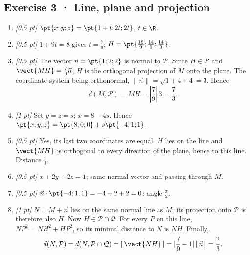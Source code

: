 \subsection*{Exercise 3 · Line, plane and projection}\begin{enumerate}

\item \textit{[0.5 pt]} $\pt{x;y;z}=\pt{1+t;2t;2t}$, $t\in\R$.

\item \textit{[0.5 pt]} $1+9t=8$ gives $t=\frac{7}{9}$; $H=\pt{\frac{16}{9};\frac{14}{9};\frac{14}{9}}$.

\item \textit{[0.5 pt]} The vector $\vec n=\pt{1;2;2}$ is normal to $\mathcal P$. Since $H\in\mathcal P$ and $\vect{MH}=\frac{7}{9}\vec n$, $H$ is the orthogonal projection of $M$ onto the plane. The coordinate system being orthonormal, $\|\vec n\|=\sqrt{1+4+4}=3$. Hence
\[d(M,\mathcal P)=MH=|\frac{7}{9}|\,3=\frac{7}{3}.\]

\item \textit{[1 pt]} Set $y=z=s$; $x=8-4s$. Hence $\pt{x;y;z}=\pt{8;0;0}+s\pt{-4;1;1}$.

\item \textit{[0.5 pt]} Yes, its last two coordinates are equal. $H$ lies on the line and $\vect{MH}$ is orthogonal to every direction of the plane, hence to this line. Distance $\frac{7}{3}$.

\item \textit{[0.5 pt]} $x+2y+2z=1$; same normal vector and passing through $M$.

\item \textit{[0.5 pt]} $\vec n\cdot\pt{-4;1;1}=-4+2+2=0$: angle $\frac{\pi}{2}$.

\item \textit{[1 pt]} $N=M+\vec n$ lies on the same normal line as $M$; its projection onto $\mathcal P$ is therefore also $H$. Now $H\in\mathcal P\cap\mathcal Q$. For every $P$ on this line, $NP^2=NH^2+HP^2$, so its minimal distance to $N$ is $NH$. Finally,
\[d(N,\mathcal P)=d(N,\mathcal P\cap\mathcal Q)=\|\vect{NH}\|=|\frac{7}{9}-1|\,\|\vec n\|=\frac{2}{3}.\]

\end{enumerate}

